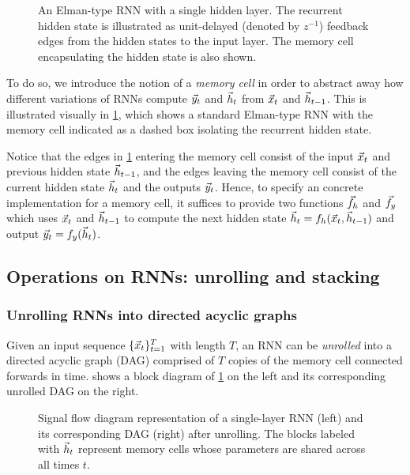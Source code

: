 \begin{figure}[tb]
  \centering
  
  \caption{An Elman-type RNN with a single hidden layer. The recurrent hidden
    state is illustrated as unit-delayed (denoted by $z^{-1}$) feedback edges
    from the hidden states to the input layer. The memory cell encapsulating the
  hidden state is also shown.}
  \label{fig:rnn-elman}
\end{figure}

To do so, we introduce the notion of a \emph{memory cell} in order to abstract
away how different variations of RNNs compute $\vec{y}_t$ and $\vec{h}_t$ from $\vec{x}_t$ and
$\vec{h}_{t-1}$. This is illustrated visually in \cref{fig:rnn-elman}, which shows a
standard Elman-type RNN \citep{elman1990finding} with the memory cell indicated
as a dashed box isolating the recurrent hidden state.

Notice that the edges in \cref{fig:rnn-elman} entering the memory cell
consist of the input $\vec{x}_t$ and previous hidden state $\vec{h}_{t-1}$,
and the edges leaving the memory cell consist of the current hidden state $\vec{h}_t$
and the outputs $\vec{y}_t$. Hence, to specify an concrete implementation for a
memory cell, it suffices to provide two functions $\vec{f}_h$ and $\vec{f}_y$ which
uses $\vec{x}_t$ and $\vec{h}_{t-1}$ to compute the next hidden state $\vec{h}_t = f_h(\vec{x}_t,
\vec{h}_{t-1})$ and output $\vec{y}_t = f_y(\vec{h}_t)$.

\subsection{Operations on RNNs: unrolling and stacking}

\subsubsection{Unrolling RNNs into directed acyclic graphs}


Given an input sequence $\{\vec{x}_{t}\}_{t=1}^T$ with length $T$, an RNN can be
\emph{unrolled} into a directed acyclic graph (DAG) comprised of $T$ copies of the
memory cell connected forwards in time.  shows
a block diagram of \cref{fig:rnn-elman} on the left and its corresponding unrolled
DAG on the right.

\begin{figure}[tb]
  \centering
  \resizebox{4.5in}{!}{}
  \caption{Signal flow diagram representation of a single-layer RNN (left) and its
    corresponding DAG (right) after unrolling. The blocks labeled
    with $\vec{h}_t$ represent memory cells whose parameters are shared across all times
  $t$.}
  \label{fig:rnn-single-unrolled}
\end{figure}

